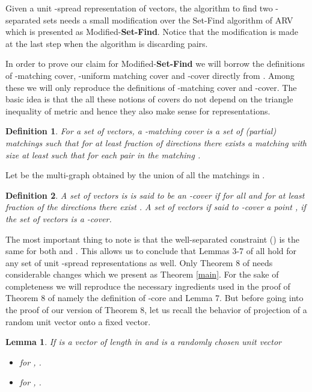 \documentclass [11pt,a4paper]{article}
\newtheorem{lemma}{Lemma}
\newtheorem{definition}{Definition}
\begin{document}
Given a unit -spread  representation of vectors, 
the algorithm to find two -separated sets needs
a small modification over the Set-Find algorithm of {\sf ARV} which is presented as 
{\sc Modified}-\textbf{Set-Find}. Notice that the modification is made at the last step
when the algorithm is discarding pairs.

In order to prove our claim for {\sc Modified}-\textbf{Set-Find} 
we will borrow the definitions of -matching cover, 
-uniform matching cover and -cover directly from \cite{ARV}. Among these
we will only reproduce the definitions of -matching cover and -cover.
The basic idea is that the all these notions of covers do not depend on the triangle inequality of  metric and
hence they also make sense for  representations. 

\begin{definition}
For a set  of vectors, a -matching cover is a set of (partial) matchings 
such that for at least  fraction of directions  there exists a matching  
with size at least  such that for each pair  in the matching 
.
\end{definition}

Let  be the multi-graph obtained by the union of all the matchings in .

\begin{definition}
A set of vectors  is is said to be an -cover if  for all 
and for at least  fraction of the directions there exist   
. A set of vectors if said to -cover 
a point , if the set of vectors  is a -cover.
\end{definition}

The most important thing to note is that the well-separated constraint 
()
is the same for both  and . This
allows us to conclude that Lemmas 3-7 of \cite{ARV} all hold for any set 
of unit -spread  representations  as well. Only Theorem 8 of \cite{ARV}
needs considerable changes which we present as Theorem \ref{main}. For the sake of 
completeness we will reproduce the necessary ingredients used in the proof of 
Theorem 8 of \cite{ARV} namely the definition of -core and Lemma 7. 
But before going into the proof of our version of Theorem 8, let us recall the behavior of 
projection of a random unit vector onto a fixed vector.

\begin{lemma} \label{gaussian}
If  is a vector of length  in  and  is a randomly chosen unit vector 
\begin{itemize}
\item for , .
\item for , .
\end{itemize}
\end{lemma}
\end{document}
